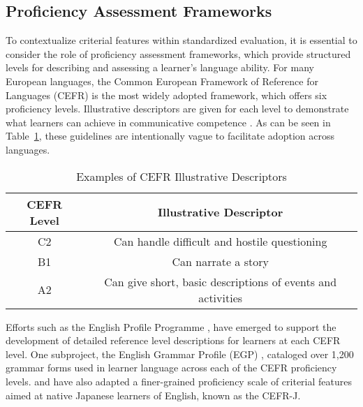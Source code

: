 \subsection{Proficiency Assessment Frameworks}



To contextualize criterial features within standardized evaluation, it is essential to consider the role of
proficiency assessment frameworks, which provide structured levels for describing and assessing a learner's language
ability. For many European languages, the Common European Framework of Reference for Languages (CEFR) is the most
widely adopted framework, which offers six proficiency levels. Illustrative
descriptors are given for each level to demonstrate what learners can achieve in communicative
competence \citep{CEFR2020}. As can be seen in Table~\ref{tab:cefr-descriptors}, these guidelines are intentionally
vague to facilitate
adoption
across
languages.

\begin{table}
\centering
\begin{tabular}{cc}
\hline \textbf{CEFR Level} & \textbf{Illustrative Descriptor} \\ \hline
C2 & Can handle difficult and hostile questioning \\
B1  & Can narrate a story \\
A2 & Can give short, basic descriptions of events and activities \\
\hline
\end{tabular}
\caption{\label{tab:cefr-descriptors} Examples of CEFR Illustrative Descriptors}
\end{table}

Efforts such
as the English Profile Programme \citep{Saville2010}, have emerged to support the development of detailed reference
level
descriptions
for learners at each CEFR level. One subproject, the English Grammar Profile (EGP) \citep{okeeffe2017},
cataloged over 1,200 grammar forms used in learner language across each of the CEFR proficiency levels.
\citet{tono2018} and \citet{ishii2016} have
also adapted a
finer-grained
proficiency scale of criterial features aimed at native Japanese learners of English, known as the CEFR-J.

